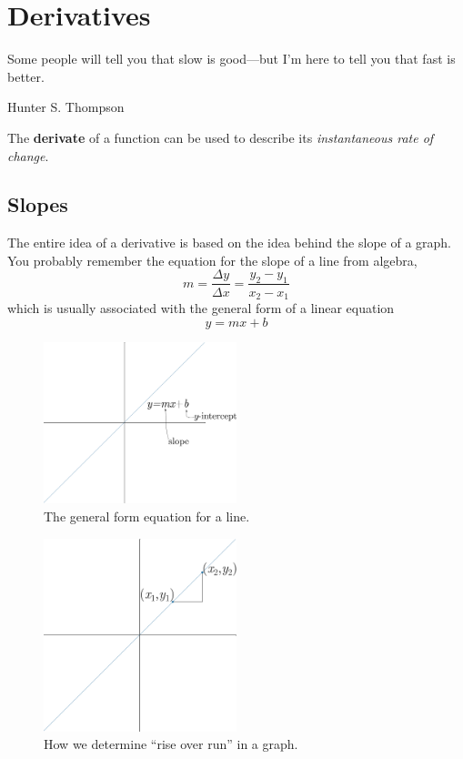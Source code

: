 \chapter{Derivatives}
\epigraph{Some people will tell you that slow is good---but I'm here to tell you that fast is better.}{Hunter S. Thompson}%


The \textbf{derivate} of a function can be used to describe its \emph{instantaneous rate of change}.

\section{Slopes}

The entire idea of a derivative is based on the idea behind the slope of a graph. You probably remember the equation for the slope of a line from algebra,
\begin{equation}
  \label{eq:slope}
  m=\frac{\Delta y}{\Delta x}=\frac{y_2-y_1}{x_2-x_1}
\end{equation}
which is usually associated with the general form of a linear equation
\begin{equation}
  y=mx+b
\end{equation}
\begin{figure}[h]
  \begin{center}
    \includegraphics[width=0.5\textwidth]{continuous/derivatives/lineform.eps}
  \end{center}
  \caption{The general form equation for a line.}
\end{figure}
\begin{figure}[h]
  \begin{center}
    \includegraphics[width=0.5\textwidth]{continuous/derivatives/lineform_slope.eps}
  \end{center}
  \caption{How we determine ``rise over run'' in a graph.}
\end{figure}
